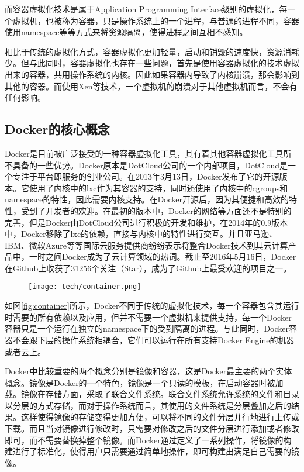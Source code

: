而容器虚拟化技术是属于Application Programming Interface级别的虚拟化，每一个虚拟机，也被称为容器，只是操作系统上的一个进程，与普通的进程不同，容器使用namespace等等方式来将资源隔离，使得进程之间互相不感知。\cite{soltesz2007container}

相比于传统的虚拟化方式，容器虚拟化更加轻量，启动和销毁的速度快，资源消耗少。但与此同时，容器虚拟化也存在一些问题，首先是使用容器虚拟化的技术虚拟出来的容器，共用操作系统的内核。因此如果容器内导致了内核崩溃，那会影响到其他的容器。而使用Xen等技术，一个虚拟机的崩溃对于其他虚拟机而言，不会有任何影响。\cite{dua2014virtualization}

\subsection{Docker的核心概念}

Docker是目前被广泛接受的一种容器虚拟化工具，其有着其他容器虚拟化工具所不具备的一些优势。Docker原本是DotCloud公司的一个内部项目，DotCloud是一个专注于平台即服务的创业公司。在2013年3月13日，Docker发布了它的开源版本。它使用了内核中的lxc作为其容器的支持，同时还使用了内核中的cgroups和namespace的特性，因此需要内核支持。在Docker开源后，因为其便捷和高效的特性，受到了开发者的欢迎。在最初的版本中，Docker的网络等方面还不是特别的完善，但是Docker由DotCloud公司进行积极的开发和维护，在2014年的0.9版本中，Docker移除了lxc的依赖，直接与内核中的特性进行交互。并且亚马逊、IBM、微软Azure等等国际云服务提供商纷纷表示将整合Docker技术到其云计算产品中，一时之间Docker成为了云计算领域的热词。截止至2016年5月16日，Docker在Github上收获了31256个关注（Star），成为了Github上最受欢迎的项目之一。

\begin{figure}[!htp]
  \centering
  \texttt{[image: tech/container.png]}
\end{figure}

如图\ref{fig:container}所示，Docker不同于传统的虚拟化技术，每一个容器包含其运行时需要的所有依赖以及应用，但并不需要一个虚拟机来提供支持，每一个Docker容器只是一个运行在独立的namespace下的受到隔离的进程。与此同时，Docker容器不会跟下层的操作系统相耦合，它们可以运行在所有支持Docker Engine的机器或者云上。

Docker中比较重要的两个概念分别是镜像和容器，这是Docker最主要的两个实体概念。镜像是Docker的一个特色，镜像是一个只读的模板，在启动容器时被加载。镜像在存储方面，采取了联合文件系统。联合文件系统允许系统的文件和目录以分层的方式存储，而对于操作系统而言，其使用的文件系统是分层叠加之后的结果。这样使得镜像的存储变得更加方便，可以将不同的文件分层并行地进行上传或下载。而且当对镜像进行修改时，只需要对修改之后的文件分层进行添加或者修改即可，而不需要替换掉整个镜像。而Docker通过定义了一系列操作，将镜像的构建进行了标准化，使得用户只需要通过简单地操作，即可构建出满足自己需要的镜像。\cite{mayue}

